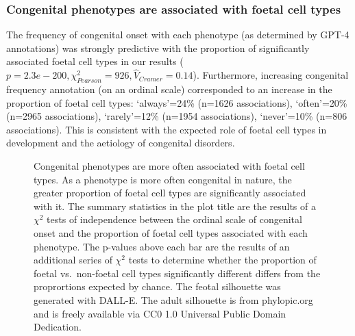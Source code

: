 \documentclass[
]{agujournal2019}
\begin{document}
\subsubsection{Congenital phenotypes are associated with foetal cell
types}\label{congenital-phenotypes-are-associated-with-foetal-cell-types}

The frequency of congenital onset with each phenotype (as determined by
GPT-4 annotations) was strongly predictive with the proportion of
significantly associated foetal cell types in our results
(\(p=2.3e-200,\chi^2_{Pearson}=926,\hat{V}_{Cramer}=0.14\)).
Furthermore, increasing congenital frequency annotation (on an ordinal
scale) corresponded to an increase in the proportion of foetal cell
types: `always'=24\% (n=1626 associations), `often'=20\% (n=2965
associations), `rarely'=12\% (n=1954 associations), `never'=10\% (n=806
associations). This is consistent with the expected role of foetal cell
types in development and the aetiology of congenital disorders.

\label{cell-fig-congenital}
\begin{figure}[H]


\caption{\label{fig-congenital}Congenital phenotypes are more often
associated with foetal cell types. As a phenotype is more often
congenital in nature, the greater proportion of foetal cell types are
significantly associated with it. The summary statistics in the plot
title are the results of a \(\chi^2\) tests of independence between the
ordinal scale of congenital onset and the proportion of foetal cell
types associated with each phenotype. The p-values above each bar are
the results of an additional series of \(\chi^2\) tests to determine
whether the proportion of foetal vs.~non-foetal cell types significantly
different differs from the proprortions expected by chance. The feotal
silhouette was generated with DALL-E. The adult silhouette is from
phylopic.org and is freely available via CC0 1.0 Universal Public Domain
Dedication.}

\end{figure}%
\end{document}

